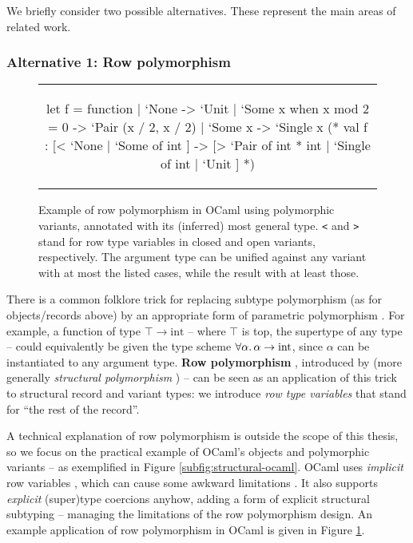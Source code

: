 We briefly consider two possible alternatives. These represent the main areas of related work.

\subsubsection{Alternative 1: Row polymorphism}

\begin{figure}
    \centering
    \begin{tabular}{c}
    \begin{ocaml}
let f = function 
    | `None -> `Unit 
    | `Some x when x mod 2 = 0 -> `Pair (x / 2, x / 2) 
    | `Some x -> `Single x
(* 
val f : [< `None | `Some of int ] 
     -> [> `Pair of int * int | `Single of int | `Unit ]
*)
    \end{ocaml}
    \end{tabular}
    \caption{Example of row polymorphism in OCaml using polymorphic variants, annotated with its (inferred) most general type. \texttt{<} and \texttt{>} stand for row type variables in closed and open variants, respectively. The argument type can be unified against any variant with at most the listed cases, while the result with at least those.}
    \label{fig:ocaml-row-polymorphism}
\end{figure}

There is a common folklore trick for replacing subtype polymorphism (as for objects/records above) by an appropriate form of parametric polymorphism \cite{structural-subtyping-as-parameric-polymorphism}. For example, a function of type $\top \to \mathrm{int}$ -- where $\top$ is top, the supertype of any type -- could equivalently be given the type scheme $\forall \alpha \ldotp \alpha \to \mathrm{int}$, since $\alpha$ can be instantiated to any argument type.
\textbf{Row polymorphism} \cite{remy-records}, introduced by \textcite{wand-rows} (more generally \emph{structural polymorphism} \cite{simple-structural-polymorphism}) -- can be seen as an application of this trick to structural record and variant types: we introduce \emph{row type variables} that stand for \enquote{the rest of the record}.

A technical explanation of row polymorphism is outside the scope of this thesis, so we focus on the practical example of OCaml's objects \cite{objective-ml} and polymorphic variants \cite{polymorphic-variants} -- as exemplified in Figure \ref{subfig:structural-ocaml}. OCaml uses \emph{implicit} row variables \cite{objective-ml}, which can cause some awkward limitations \cite{castagna-polymorphic-variants}. It also supports \emph{explicit} (super)type coercions anyhow, adding a form of explicit structural subtyping -- managing the limitations of the row polymorphism design. 
An example application of row polymorphism in OCaml is given in Figure \ref{fig:ocaml-row-polymorphism}.

